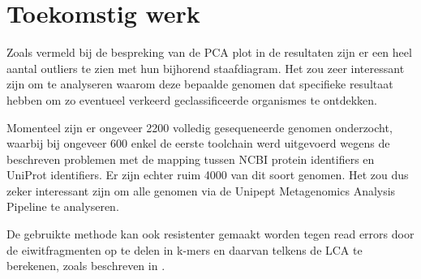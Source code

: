 \section{Toekomstig werk} 

Zoals vermeld bij de bespreking van de PCA plot in de resultaten zijn er een
heel aantal outliers te zien met hun bijhorend staafdiagram. Het zou zeer
interessant zijn om te analyseren waarom deze bepaalde genomen dat specifieke
resultaat hebben om zo eventueel verkeerd geclassificeerde organismes te
ontdekken.

Momenteel zijn er ongeveer 2200 volledig gesequeneerde genomen onderzocht,
waarbij bij ongeveer 600 enkel de eerste toolchain werd uitgevoerd wegens de
beschreven problemen met de mapping tussen NCBI protein identifiers en UniProt
identifiers. Er zijn echter ruim 4000 van dit soort genomen. Het zou dus zeker
interessant zijn om alle genomen via de Unipept Metagenomics Analysis Pipeline
te analyseren.

De gebruikte methode kan ook resistenter gemaakt worden tegen read errors door 
de eiwitfragmenten op te delen in k-mers en daarvan telkens de LCA te 
berekenen, zoals beschreven in \cite{wood2014kraken}.